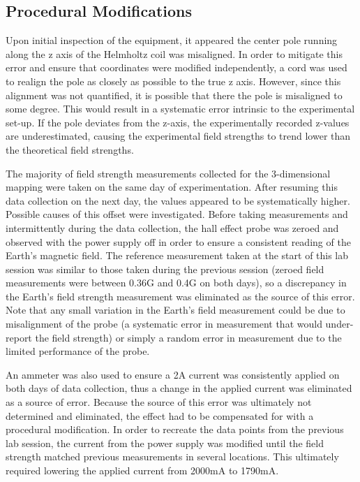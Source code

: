 \documentclass[a4paper]{article}
\begin{document}
\subsection{Procedural Modifications}

\qq Upon initial inspection of the equipment, it appeared the center pole running
along the z axis of the Helmholtz coil was misaligned. In order to mitigate this
error and ensure that coordinates were modified independently, a cord was used
to realign the pole as closely as possible to the true z axis. However, since
this alignment was not quantified, it is possible that there the pole is
misaligned to some degree. This would result in a systematic error intrinsic to
the experimental set-up. If the pole deviates from the z-axis, the
experimentally recorded z-values are underestimated, causing the experimental
field strengths to trend lower than the theoretical field strengths.

\qq The majority of field strength measurements collected for the 3-dimensional
mapping were taken on the same day of experimentation. After resuming this data
collection on the next day, the values appeared to be systematically
higher. Possible causes of this offset were investigated. Before taking
measurements and intermittently during the data collection, the hall effect
probe was zeroed and observed with the power supply off in order to ensure a
consistent reading of the Earth's magnetic field. The reference measurement
taken at the start of this lab session was similar to those taken during the
previous session (zeroed field measurements were between 0.36G and 0.4G on both
days), so a discrepancy in the Earth's field strength measurement was eliminated
as the source of this error. Note that any small variation in the Earth's field
measurement could be due to misalignment of the probe (a systematic error in
measurement that would under-report the field strength) or simply a random error
in measurement due to the limited performance of the probe.

\qq An ammeter was also used to ensure a 2A current was consistently applied on both
days of data collection, thus a change in the applied current was eliminated as
a source of error. Because the source of this error was ultimately not
determined and eliminated, the effect had to be compensated for with a
procedural modification. In order to recreate the data points from the previous
lab session, the current from the power supply was modified until the field
strength matched previous measurements in several locations. This ultimately
required lowering the applied current from 2000mA to 1790mA.
\end{document}
